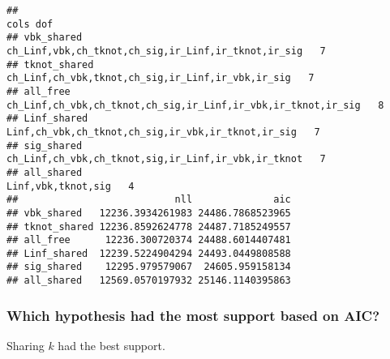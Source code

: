\documentclass[
]{article}
\newenvironment{Shaded}{\begin{snugshade}}{\end{snugshade}}
\newcommand{\KeywordTok}[1]{\textcolor[rgb]{0.13,0.29,0.53}{\textbf{#1}}}
\newcommand{\NormalTok}[1]{#1}
\newcommand{\OperatorTok}[1]{\textcolor[rgb]{0.81,0.36,0.00}{\textbf{#1}}}
\newcommand{\StringTok}[1]{\textcolor[rgb]{0.31,0.60,0.02}{#1}}
\begin{document}
\begin{Shaded}
\end{Shaded}

\begin{verbatim}
##                                                                       cols dof
## vbk_shared             ch_Linf,vbk,ch_tknot,ch_sig,ir_Linf,ir_tknot,ir_sig   7
## tknot_shared             ch_Linf,ch_vbk,tknot,ch_sig,ir_Linf,ir_vbk,ir_sig   7
## all_free     ch_Linf,ch_vbk,ch_tknot,ch_sig,ir_Linf,ir_vbk,ir_tknot,ir_sig   8
## Linf_shared             Linf,ch_vbk,ch_tknot,ch_sig,ir_vbk,ir_tknot,ir_sig   7
## sig_shared             ch_Linf,ch_vbk,ch_tknot,sig,ir_Linf,ir_vbk,ir_tknot   7
## all_shared                                              Linf,vbk,tknot,sig   4
##                           nll              aic
## vbk_shared   12236.3934261983 24486.7868523965
## tknot_shared 12236.8592624778 24487.7185249557
## all_free      12236.300720374 24488.6014407481
## Linf_shared  12239.5224904294 24493.0449808588
## sig_shared    12295.979579067  24605.959158134
## all_shared   12569.0570197932 25146.1140395863
\end{verbatim}

\hypertarget{which-hypothesis-had-the-most-support-based-on-aic-1}{%
\subsubsection{Which hypothesis had the most support based on
AIC?}\label{which-hypothesis-had-the-most-support-based-on-aic-1}}

Sharing \(k\) had the best support.
\end{document}
